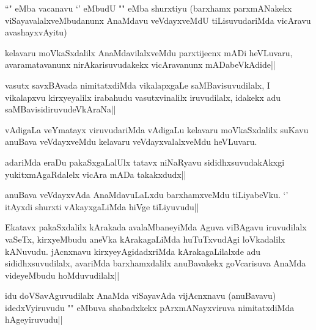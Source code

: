 \begin{artha}
``\stext " eMba vacanavu `\stext ' eMbudU "\stext " eMba shurxtiyu (barxhamx parxmANakekx viSayavalalxveMbudanunx AnaMdavu veVdayxveMdU tiLisuvudariMda vicAravu avashayxvAyitu)
\end{artha}

\begin{artha}
kelavaru moVkaSxdalilx AnaMdavilalxveMdu parxtijecnx mADi heVLuvaru, avaramatavanunx nirAkarisuvudakekx vicAravanunx mADabeVkAdide||
\end{artha}


\begin{artha}%
vasutx savxBAvada nimitatxdiMda vikalapxgaLe saMBavisuvudilalx, I vikalapxvu kirxyeyalilx irabahudu vasutxvinalilx iruvudilalx, idakekx adu saMBavisidiruvudeVkAraNa||
\end{artha}


\begin{artha}
vAdigaLa veYmatayx viruvudariMda vAdigaLu kelavaru moVkaSxdalilx suKavu anuBava veVdayxveMdu kelavaru veVdayxvalalxveMdu heVLuvaru.
\end{artha}

\begin{artha}
adariMda eraDu pakaSxgaLalUlx tatavx niNaRyavu sididhxsuvudakAkxgi yukitxmAgaRdalelx vicAra mADa takakxdudx||
\end{artha}

\begin{artha}
anuBava veVdayxvAda AnaMdavuLaLxdu barxhamxveMdu tiLiyabeVku. `\stext ' itAyxdi shurxti vAkayxgaLiMda hiVge tiLiyuvudu||
\end{artha}


\begin{artha}%
Ekatavx pakaSxdalilx kArakada avalaMbaneyiMda Aguva viBAgavu iruvudilalx vaSeTx, kirxyeMbudu aneVka kArakagaLiMda huTuTxvudAgi loVkadalilx kANuvudu. jAcnxnavu kirxyeyAgidadxriMda kArakagaLilalxde adu sididhxsuvudilalx, avariMda barxhamxdalilx anuBavakekx goVcarisuva AnaMda videyeMbudu hoMduvudilalx||
\end{artha}


\begin{artha}
idu doVSavAguvudilalx AnaMda viSayavAda vijAcnxnavu (anuBavavu) idedxVyiruvudu "\stext " eMbuva shabadxkekx pArxmANayxviruva nimitatxdiMda hAgeyiruvudu||
\end{artha}

